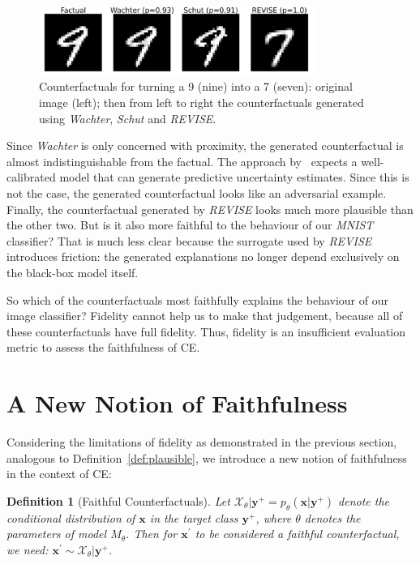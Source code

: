 \documentclass{article}
\newtheorem{definition}{Definition}[section]
\begin{document}
\begin{figure}
  \centering
  \includegraphics[width=0.8\textwidth]{../artifacts/results/images/mnist_motivation.png}
  \caption{Counterfactuals for turning a 9 (nine) into a 7 (seven): original image (left); then from left to right the counterfactuals generated using \textit{Wachter}, \textit{Schut} and \textit{REVISE}.}\label{fig:motiv}
\end{figure}

Since \textit{Wachter} is only concerned with proximity, the generated counterfactual is almost indistinguishable from the factual. The approach by~\citet{schut2021generating} expects a well-calibrated model that can generate predictive uncertainty estimates. Since this is not the case, the generated counterfactual looks like an adversarial example. Finally, the counterfactual generated by \textit{REVISE} looks much more plausible than the other two. But is it also more faithful to the behaviour of our \textit{MNIST} classifier? That is much less clear because the surrogate used by \textit{REVISE} introduces friction: the generated explanations no longer depend exclusively on the black-box model itself. 

So which of the counterfactuals most faithfully explains the behaviour of our image classifier? Fidelity cannot help us to make that judgement, because all of these counterfactuals have full fidelity. Thus, fidelity is an insufficient evaluation metric to assess the faithfulness of CE. 

\section{A New Notion of Faithfulness}\label{faithfulness}

Considering the limitations of fidelity as demonstrated in the previous section, analogous to Definition~\ref{def:plausible}, we introduce a new notion of faithfulness in the context of CE:

\begin{definition}[Faithful Counterfactuals]
  \label{def:faithful}
  Let $\mathcal{X}_{\theta}|\mathbf{y}^+ = p_{\theta}(\mathbf{x}|\mathbf{y}^+)$ denote the conditional distribution of $\mathbf{x}$ in the target class $\mathbf{y}^+$, where $\theta$ denotes the parameters of model $M_{\theta}$. Then for $\mathbf{x}^{\prime}$ to be considered a faithful counterfactual, we need: $\mathbf{x}^{\prime} \sim \mathcal{X}_{\theta}|\mathbf{y}^+$.
\end{definition}
\end{document}
